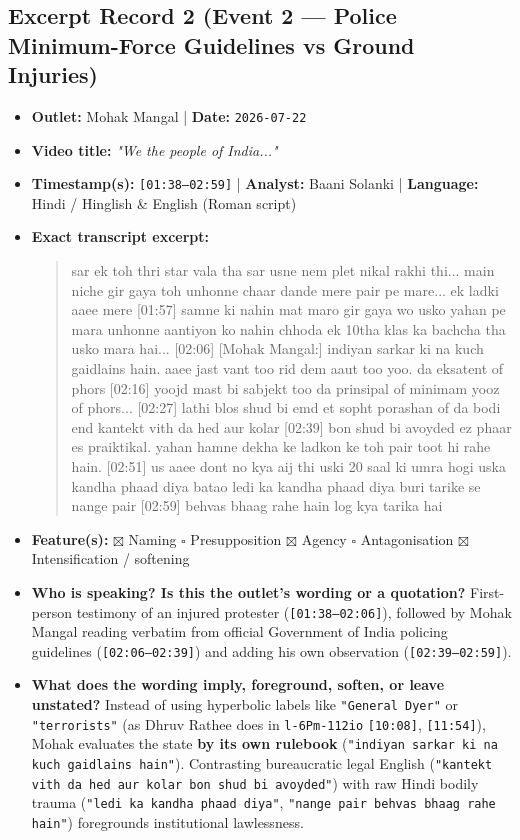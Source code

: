 \documentclass[10pt,a4paper]{article}
\begin{document}
\subsection*{Excerpt Record 2 (Event 2 --- Police Minimum-Force Guidelines vs Ground Injuries)}
\begin{itemize}[leftmargin=1.5em, itemsep=3pt, topsep=4pt]
  \item \textbf{Outlet:} Mohak Mangal | \textbf{Date:} \texttt{2026-07-22}
  \item \textbf{Video title:} \textit{"We the people of India..."}
  \item \textbf{Timestamp(s):} \texttt{[01:38--02:59]} | \textbf{Analyst:} Baani Solanki | \textbf{Language:} Hindi / Hinglish \& English (Roman script)
  \item \textbf{Exact transcript excerpt:}
    \begin{quote}\small{} sar ek toh thri star vala tha sar usne nem plet nikal rakhi thi... main niche gir gaya toh unhonne chaar dande mere pair pe mare... ek ladki aaee mere [01:57] samne ki nahin mat maro gir gaya wo usko yahan pe mara unhonne aantiyon ko nahin chhoda ek 10tha klas ka bachcha tha usko mara hai... [02:06] [Mohak Mangal:] indiyan sarkar ki na kuch gaidlains hain. aaee jast vant too rid dem aaut too yoo. da eksatent of phors [02:16] yoojd mast bi sabjekt too da prinsipal of minimam yooz of phors... [02:27] lathi blos shud bi emd et sopht porashan of da bodi end kantekt vith da hed aur kolar [02:39] bon shud bi avoyded ez phaar es praiktikal. yahan hamne dekha ke ladkon ke toh pair toot hi rahe hain. [02:51] us aaee dont no kya aij thi uski 20 saal ki umra hogi uska kandha phaad diya batao ledi ka kandha phaad diya buri tarike se nange pair [02:59] behvas bhaag rahe hain log kya tarika hai\end{quote}
  \item \textbf{Feature(s):} $\boxtimes$ Naming $\square$ Presupposition $\boxtimes$ Agency $\square$ Antagonisation $\boxtimes$ Intensification / softening
  \item \textbf{Who is speaking? Is this the outlet's wording or a quotation?} First-person testimony of an injured protester (\texttt{[01:38--02:06]}), followed by Mohak Mangal reading verbatim from official Government of India policing guidelines (\texttt{[02:06--02:39]}) and adding his own observation (\texttt{[02:39--02:59]}).
  \item \textbf{What does the wording imply, foreground, soften, or leave unstated?} Instead of using hyperbolic labels like \texttt{"General Dyer"} or \texttt{"terrorists"} (as Dhruv Rathee does in \texttt{l-6Pm-112io} \texttt{[10:08]}, \texttt{[11:54]}), Mohak evaluates the state \textbf{by its own rulebook} (\texttt{"indiyan sarkar ki na kuch gaidlains hain"}). Contrasting bureaucratic legal English (\texttt{"kantekt vith da hed aur kolar bon shud bi avoyded"}) with raw Hindi bodily trauma (\texttt{"ledi ka kandha phaad diya"}, \texttt{"nange pair behvas bhaag rahe hain"}) foregrounds institutional lawlessness.

\end{itemize}
\end{document}
